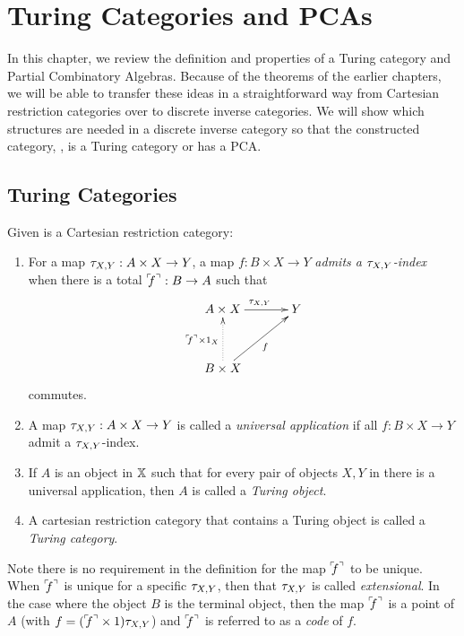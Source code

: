 \chapter{Turing Categories and PCAs} %
\label{chap:turing_categories}

In this chapter, we review the definition and properties of a Turing
category\cite{cockett-hostra08-intro-to-turing} and Partial Combinatory Algebras. Because of the
theorems of the earlier chapters, we will be able to transfer these ideas in a straightforward way
from Cartesian restriction categories over to discrete inverse categories. We will show which
structures are needed in a discrete inverse category \X so that the constructed category, \Xt, is a
Turing category or has a PCA.

\section{Turing Categories}
\label{sec:turing_category_definitions}


\begin{definition}\label{def:turing_category}
  Given \X is a Cartesian restriction category:
  \begin{enumerate}
    \item For a map $\tau_{{X},{Y}}: A \times X \to Y$, a map $f:B\times X \to Y$ \emph{admits a $\tau_{{X},{Y}}$-index}
      when there is a total ${}^\ulcorner\!\!f^\urcorner:B\to A$ such that
      \[
        \xymatrix@C+10pt@R+10pt{
          A\times X \ar[r]^{\txy} & Y \\
          B\times X \ar@{.>}[u]^{\code{f}\times 1_X} \ar[ur]_f
        }
      \]
      commutes.\label{defitem:turing_admit_txy_index}
    \item A map $\tau_{{X},{Y}}: A \times X \to Y$ is called a \emph{universal application} if all
      $f:B\times X \to Y$ admit a $\tau_{{X},{Y}}$-index.\label{defitem:turing_universal_application}
    \item If $A$ is an object in $\mathbb{X}$ such that for every pair of objects $X,Y$ in \X there is
      a universal application, then $A$ is called a \emph{Turing object}.
    \item A cartesian restriction category that contains a Turing object is called a
      \emph{Turing category}.
  \end{enumerate}
\end{definition}

Note there is no requirement in the definition for the map ${}^\ulcorner\!\!f^\urcorner$ to be unique. When ${}^\ulcorner\!\!f^\urcorner$ is unique
for a specific $\tau_{{X},{Y}}$, then that $\tau_{{X},{Y}}$ is called \emph{extensional}. In the case where the object
$B$ is the terminal object, then the map ${}^\ulcorner\!\!f^\urcorner$ is a point of $A$ (with $f = ({}^\ulcorner\!\!f^\urcorner \times 1)\tau_{{X},{Y}}$) and
${}^\ulcorner\!\!f^\urcorner$ is referred to as a \emph{code} of $f$.

